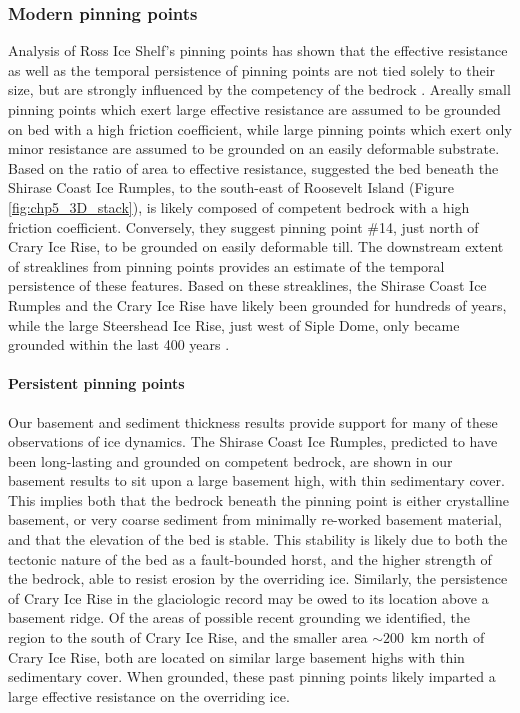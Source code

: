 \subsubsection{Modern pinning points}
Analysis of Ross Ice Shelf's pinning points has shown that the effective resistance as well as the temporal persistence of pinning points are not tied solely to their size, but are strongly influenced by the competency of the bedrock \citep{stillmechanical2019, stillmechanics2021}. Areally small pinning points which exert large effective resistance are assumed to be grounded on bed with a high friction coefficient, while large pinning points which exert only minor resistance are assumed to be grounded on an easily deformable substrate. Based on the ratio of area to effective resistance, \citet{stillmechanical2019} suggested the bed beneath the Shirase Coast Ice Rumples, to the south-east of Roosevelt Island (Figure \ref{fig:chp5_3D_stack}), is likely composed of competent bedrock with a high friction coefficient. Conversely, they suggest pinning point \#14, just north of Crary Ice Rise, to be grounded on easily deformable till. The downstream extent of streaklines from pinning points provides an estimate of the temporal persistence of these features. Based on these streaklines, the Shirase Coast Ice Rumples and the Crary Ice Rise have likely been grounded for hundreds of years, while the large Steershead Ice Rise, just west of Siple Dome, only became grounded within the last 400 years \citep{stillmechanical2019, fahnestockmillennium2000}. \\

\paragraph*{Persistent pinning points}
Our basement and sediment thickness results provide support for many of these observations of ice dynamics. The Shirase Coast Ice Rumples, predicted to have been long-lasting and grounded on competent bedrock, are shown in our basement results to sit upon a large basement high, with thin sedimentary cover. This implies both that the bedrock beneath the pinning point is either crystalline basement, or very coarse sediment from minimally re-worked basement material, and that the elevation of the bed is stable. This stability is likely due to both the tectonic nature of the bed as a fault-bounded horst, and the higher strength of the bedrock, able to resist erosion by the overriding ice. Similarly, the persistence of Crary Ice Rise in the glaciologic record may be owed to its location above a basement ridge. Of the areas of possible recent grounding we identified, the region to the south of Crary Ice Rise, and the smaller area $\sim200$~km north of Crary Ice Rise, both are located on similar large basement highs with thin sedimentary cover. When grounded, these past pinning points likely imparted a large effective resistance on the overriding ice. \\

